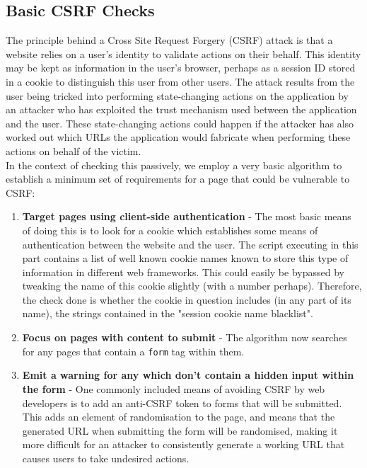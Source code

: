\subsection{Basic CSRF Checks} \label{csrfChecks}

The principle behind a Cross Site Request Forgery (CSRF) attack is that a website relies on a user's identity to validate actions on their behalf. This identity may be kept as information in the user's browser, perhaps as a session ID stored in a cookie to distinguish this user from other users. The attack results from the user being tricked into performing state-changing actions on the application by an attacker who has exploited the trust mechanism used between the application and the user. These state-changing actions could happen if the attacker has also worked out which URLs the application would fabricate when performing these actions on behalf of the victim. \\

In the context of checking this passively, we employ a very basic algorithm to establish a minimum set of requirements for a page that could be vulnerable to CSRF:

\begin{enumerate}
	\item \textbf{Target pages using client-side authentication} - The most basic means of doing this is to look for a cookie which establishes some means of authentication between the website and the user. The script executing in this part contains a list of well known cookie names known to store this type of information in different web frameworks. This could easily be bypassed by tweaking the name of this cookie slightly (with a number perhaps). Therefore, the check done is whether the cookie in question includes (in any part of its name), the strings contained in the "session cookie name blacklist".
	
	\item \textbf{Focus on pages with content to submit} - The algorithm now searches for any pages that contain a \texttt{form} tag within them. 
	
	\item \textbf{Emit a warning for any which don't contain a hidden input within the form} - One commonly included means of avoiding CSRF by web developers is to add an anti-CSRF token to forms that will be submitted. This adds an element of randomisation to the page, and means that the generated URL when submitting the form will be randomised, making it more difficult for an attacker to consistently generate a working URL that causes users to take undesired actions.
\end{enumerate}


